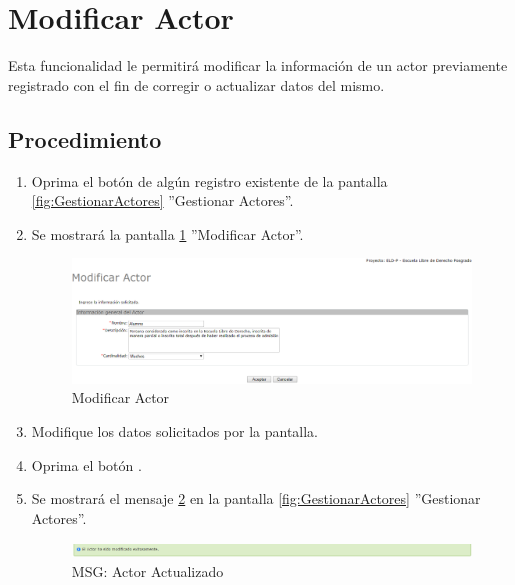 \hypertarget{cv:modificarActor}{\section{Modificar Actor}} \label{sec:modificarActor}

	Esta funcionalidad le permitirá modificar la información de un actor previamente registrado con el fin de corregir o actualizar datos del mismo. 

		\subsection{Procedimiento}

			\begin{enumerate}
	
			\item Oprima el botón \IUEditar{} de algún registro existente de la pantalla \ref{fig:GestionarActores} ''Gestionar Actores''.
	
			\item Se mostrará la pantalla \ref{fig:modificarActor} ''Modificar Actor''.
			
			\begin{figure}[htbp!]
				\begin{center}
					\includegraphics[scale=0.5]{roles/lider/actor/pantallas/IU10-2modificarActor}
					\caption{Modificar Actor}
					\label{fig:modificarActor}
				\end{center}
			\end{figure}
		
			\item Modifique los datos solicitados por la pantalla.
						
			\item Oprima el botón \IUAceptar.
			
			\item Se mostrará el mensaje \ref{fig:actorModificado} en la pantalla \ref{fig:GestionarActores} ''Gestionar Actores''.
			
			\begin{figure}[htbp!]
				\begin{center}
					\includegraphics[scale=0.5]{roles/lider/actor/pantallas/IU10-2MSG1}
					\caption{MSG: Actor Actualizado}
					\label{fig:actorModificado}
				\end{center}
			\end{figure}
			\end{enumerate}
